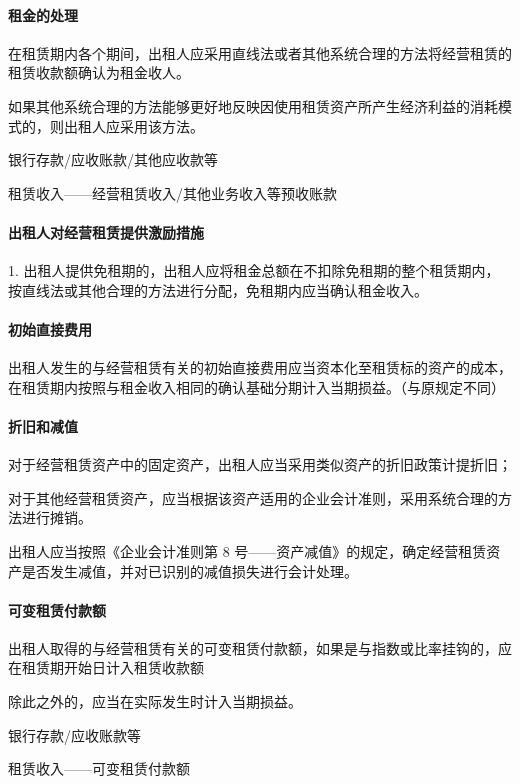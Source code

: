 \documentclass[UTF8,12pt]{ctexart}
\newenvironment{Dr}{%
	\begin{list}{}%
		{
			\setlength{\leftmargin}{2em}
			\setlength{\labelwidth}{2em}
			\setlength{\labelsep}{0pt}
			\setlength{\itemindent}{0pt}
			\setlength{\listparindent}{0pt}
			\setlength{\parsep}{0pt}
			\setlength{\topsep}{0pt}
		}
		\item[\textbf{借：}]
	}{%
	\end{list}
}
\newenvironment{Cr}{%
	\begin{list}{}%
		{
			\setlength{\leftmargin}{3em}
			\setlength{\labelwidth}{2em}
			\setlength{\labelsep}{0pt}
			\setlength{\itemindent}{0pt}
			\setlength{\listparindent}{0pt}
			\setlength{\parsep}{0pt}
			\setlength{\topsep}{0pt}
		}
		\item[\textbf{贷：}]
	}{%
	\end{list}
}
\numberwithin{equation}{section} %
\numberwithin{figure}{section}
\numberwithin{table}{section}
\begin{document}
	\paragraph{租金的处理}
	在租赁期内各个期间，出租人应采用直线法或者其他系统合理的方法将经营租赁的租赁收款额确认为租金收人。
	
	如果其他系统合理的方法能够更好地反映因使用租赁资产所产生经济利益的消耗模式的，则出租人应采用该方法。
	\begin{Dr}
		银行存款/应收账款/其他应收款等
	\end{Dr}
	\begin{Cr}
		租赁收入——经营租赁收入/其他业务收入等预收账款
	\end{Cr}
	
	\paragraph{出租人对经营租赁提供激励措施}1.	出租人提供免租期的，出租人应将租金总额在不扣除免租期的整个租赁期内，按直线法或其他合理的方法进行分配，免租期内应当确认租金收入。

	
	\paragraph{初始直接费用}出租人发生的与经营租赁有关的初始直接费用应当资本化至租赁标的资产的成本，在租赁期内按照与租金收入相同的确认基础分期计入当期损益。（与原规定不同）
	
	\paragraph{折旧和减值}
	对于经营租赁资产中的固定资产，出租人应当采用类似资产的折旧政策计提折旧；
	
	对于其他经营租赁资产，应当根据该资产适用的企业会计准则，采用系统合理的方法进行摊销。
	
	出租人应当按照《企业会计准则第 8 号——资产减值》的规定，确定经营租赁资产是否发生减值，并对已识别的减值损失进行会计处理。
	
	
	\paragraph{可变租赁付款额}
	出租人取得的与经营租赁有关的可变租赁付款额，如果是与指数或比率挂钩的，应在租赁期开始日计入租赁收款额
	
	除此之外的，应当在实际发生时计入当期损益。
	\begin{Dr}
		银行存款/应收账款等
	\end{Dr}
	\begin{Cr}
		租赁收入——可变租赁付款额
	\end{Cr}
	
\end{document}
